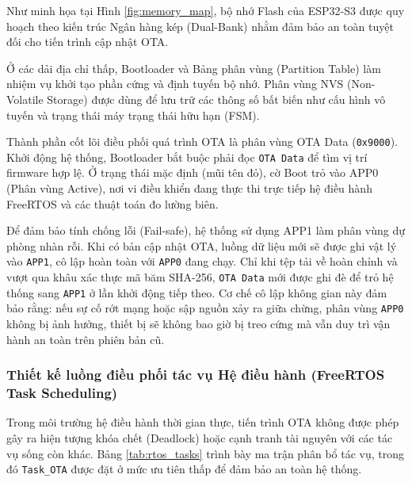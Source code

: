Như minh họa tại Hình \ref{fig:memory_map}, bộ nhớ Flash của ESP32-S3 được quy hoạch theo kiến trúc Ngân hàng kép (Dual-Bank) nhằm đảm bảo an toàn tuyệt đối cho tiến trình cập nhật OTA.

Ở các dải địa chỉ thấp, Bootloader và Bảng phân vùng (Partition Table) làm nhiệm vụ khởi tạo phần cứng và định tuyến bộ nhớ. Phân vùng NVS (Non-Volatile Storage) được dùng để lưu trữ các thông số bất biến như cấu hình vô tuyến và trạng thái máy trạng thái hữu hạn (FSM).

Thành phần cốt lõi điều phối quá trình OTA là phân vùng OTA Data (\texttt{0x9000}). Khởi động hệ thống, Bootloader bắt buộc phải đọc \texttt{OTA Data} để tìm vị trí firmware hợp lệ. Ở trạng thái mặc định (mũi tên đỏ), cờ Boot trỏ vào APP0 (Phân vùng Active), nơi vi điều khiển đang thực thi trực tiếp hệ điều hành FreeRTOS và các thuật toán đo lường biên.

Để đảm bảo tính chống lỗi (Fail-safe), hệ thống sử dụng APP1 làm phân vùng dự phòng nhàn rỗi. Khi có bản cập nhật OTA, luồng dữ liệu mới sẽ được ghi vật lý vào \texttt{APP1}, cô lập hoàn toàn với \texttt{APP0} đang chạy. Chỉ khi tệp tải về hoàn chỉnh và vượt qua khâu xác thực mã băm SHA-256, \texttt{OTA Data} mới được ghi đè để trỏ hệ thống sang \texttt{APP1} ở lần khởi động tiếp theo. Cơ chế cô lập không gian này đảm bảo rằng: nếu sự cố rớt mạng hoặc sập nguồn xảy ra giữa chừng, phân vùng \texttt{APP0} không bị ảnh hưởng, thiết bị sẽ không bao giờ bị treo cứng mà vẫn duy trì vận hành an toàn trên phiên bản cũ.

\subsubsection{Thiết kế luồng điều phối tác vụ Hệ điều hành (FreeRTOS Task Scheduling)}
Trong môi trường hệ điều hành thời gian thực, tiến trình OTA không được phép gây ra hiện tượng khóa chết (Deadlock) hoặc cạnh tranh tài nguyên với các tác vụ sống còn khác. Bảng \ref{tab:rtos_tasks} trình bày ma trận phân bổ tác vụ, trong đó \texttt{Task\_OTA} được đặt ở mức ưu tiên thấp để đảm bảo an toàn hệ thống.

